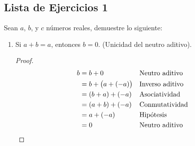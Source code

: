 \documentclass[11pt]{article}
\begin{document}
\pagebreak

\subsection*{Lista de Ejercicios 1}

Sean $a$, $b$, y $c$ números reales, demuestre lo siguiente:

\begin{enumerate}[label=\alph*)]
    \item Si $a+b=a$, entonces $b=0$. (Unicidad del neutro aditivo).
    \vspace{-1em}\begin{proof}
        \begin{align*}
            b &= b + 0 && \text{Neutro aditivo}\\
            &= b + \bigl(a+(-a)\bigr) && \text{Inverso aditivo}\\
            &= (b+a) + (-a) && \text{Asociatividad}\\
            &= (a+b) + (-a) && \text{Conmutatividad}\\
            &= a + (-a) && \text{Hipótesis}\\
            &= 0 && \text{Neutro aditivo} \qedhere
        \end{align*}
    \end{proof}\vspace{-1em}
    

\end{enumerate}
\end{document}
